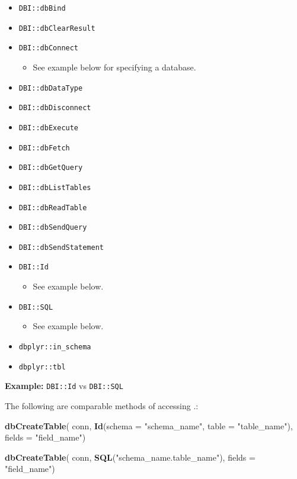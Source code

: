 \documentclass[
]{book}
\newenvironment{Shaded}{\begin{snugshade}}{\end{snugshade}}
\newcommand{\DataTypeTok}[1]{\textcolor[rgb]{0.13,0.29,0.53}{#1}}
\newcommand{\KeywordTok}[1]{\textcolor[rgb]{0.13,0.29,0.53}{\textbf{#1}}}
\newcommand{\NormalTok}[1]{#1}
\newcommand{\StringTok}[1]{\textcolor[rgb]{0.31,0.60,0.02}{#1}}
\providecommand{\tightlist}{%
  \setlength{\itemsep}{0pt}\setlength{\parskip}{0pt}}
\begin{document}
\begin{itemize}
\tightlist
\item
  \texttt{DBI::dbBind}
\item
  \texttt{DBI::dbClearResult}
\item
  \texttt{DBI::dbConnect}

  \begin{itemize}
  \tightlist
  \item
    See example below for specifying a database.
  \end{itemize}
\item
  \texttt{DBI::dbDataType}
\item
  \texttt{DBI::dbDisconnect}
\item
  \texttt{DBI::dbExecute}
\item
  \texttt{DBI::dbFetch}
\item
  \texttt{DBI::dbGetQuery}
\item
  \texttt{DBI::dbListTables}
\item
  \texttt{DBI::dbReadTable}
\item
  \texttt{DBI::dbSendQuery}
\item
  \texttt{DBI::dbSendStatement}
\item
  \texttt{DBI::Id}

  \begin{itemize}
  \tightlist
  \item
    See example below.
  \end{itemize}
\item
  \texttt{DBI::SQL}

  \begin{itemize}
  \tightlist
  \item
    See example below.
  \end{itemize}
\item
  \texttt{dbplyr::in\_schema}
\item
  \texttt{dbplyr::tbl}
\end{itemize}

\textbf{Example:} \texttt{DBI::Id} vs \texttt{DBI::SQL}

The following are comparable methods of accessing .:

\begin{Shaded}
\begin{Highlighting}[]
\KeywordTok{dbCreateTable}\NormalTok{(}
\NormalTok{  conn,}
  \KeywordTok{Id}\NormalTok{(}\DataTypeTok{schema =} \StringTok{"schema_name"}\NormalTok{, }\DataTypeTok{table =} \StringTok{"table_name"}\NormalTok{),}
  \DataTypeTok{fields =} \StringTok{"field_name"}\NormalTok{)}

\KeywordTok{dbCreateTable}\NormalTok{(}
\NormalTok{  conn,}
  \KeywordTok{SQL}\NormalTok{(}\StringTok{"schema_name.table_name"}\NormalTok{),}
  \DataTypeTok{fields =} \StringTok{"field_name"}\NormalTok{)}
\end{Highlighting}
\end{Shaded}
\end{document}
